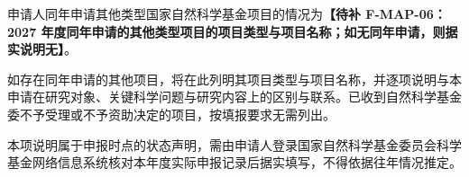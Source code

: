 \justifying
\NSFCBodyText

申请人同年申请其他类型国家自然科学基金项目的情况为\textbf{【待补 F-MAP-06：2027 年度同年申请的其他类型项目的项目类型与项目名称；如无同年申请，则据实说明无】}。

如存在同年申请的其他项目，将在此列明其项目类型与项目名称，并逐项说明与本申请在研究对象、关键科学问题与研究内容上的区别与联系。已收到自然科学基金委不予受理或不予资助决定的项目，按填报要求无需列出。

本项说明属于申报时点的状态声明，需由申请人登录国家自然科学基金委员会科学基金网络信息系统核对本年度实际申报记录后据实填写，不得依据往年情况推定。
